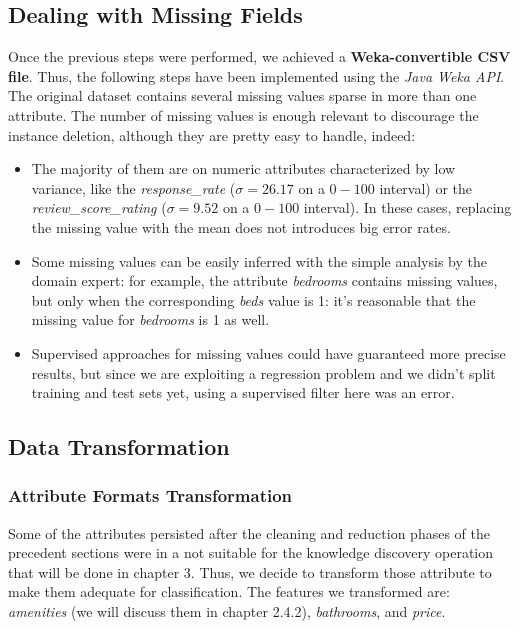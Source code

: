 \subsection{Dealing with Missing Fields}
Once the previous steps were performed, we achieved a \textbf{Weka-convertible CSV file}. Thus, the following steps have been implemented using the \textit{Java Weka API}.
The original dataset contains several missing values sparse in more than one attribute. The number of missing values is enough relevant to discourage the instance deletion, although they are pretty easy to handle, indeed:

\begin{itemize}
	\item The majority of them are on numeric attributes characterized by low variance, like the \textit{response\_rate} ($\sigma =26.17$ on a $0-100$ interval) or the \textit{review\_score\_rating} ($\sigma=9.52$ on a $0-100$ interval). In these cases, replacing the missing value with the mean does not introduces big error rates.
	\item Some missing values can be easily inferred with the simple analysis by the domain expert: for example, the attribute \textit{bedrooms} contains missing values, but only when the corresponding \textit{beds} value is 1: it’s reasonable that the missing value for \textit{bedrooms} is 1 as well.
	\item Supervised approaches for missing values could have guaranteed more precise results, but since we are exploiting a regression problem and we didn’t split training and test sets yet, using a supervised filter here was an error.
\end{itemize}

\subsection{Data Transformation}

\subsubsection{Attribute Formats Transformation}
Some of the attributes persisted after the cleaning and reduction phases of the precedent sections were in a not suitable for the knowledge discovery operation that will be done in chapter 3. Thus, we decide to transform those attribute to make them adequate for classification. The features we transformed are: \textit{amenities} (we will discuss them in chapter 2.4.2), \textit{bathrooms}, and \textit{price}.

